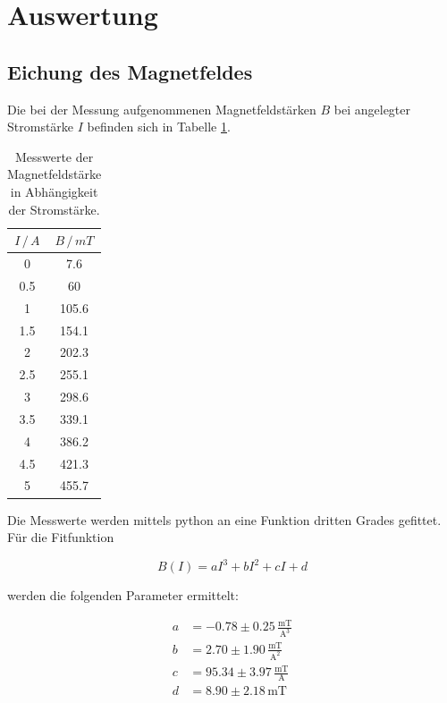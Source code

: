 \newpage
\section{Auswertung}
\label{sec:Auswertung}
\subsection{Eichung des Magnetfeldes}
\label{sec:eich}
Die bei der Messung aufgenommenen Magnetfeldstärken $B$ bei angelegter Stromstärke $I$ befinden sich in Tabelle \ref{tab:bfeld}.

\begin{table}
    \centering
    \begin{tabular}{c c}
    \toprule
    $I \,/\,A$ & $B \,/\, mT$ \\
     \midrule 
  0  & 7.6  \\
  0.5  & 60  \\
  1  & 105.6   \\
  1.5  & 154.1  \\
  2  & 202.3   \\
  2.5  & 255.1  \\
  3  & 298.6   \\
  3.5  & 339.1  \\
  4  &  386.2   \\
  4.5  &  421.3 \\
  5  & 455.7 \\
    \bottomrule
    \end{tabular}
    \caption{Messwerte der Magnetfeldstärke in Abhängigkeit der Stromstärke.}
    \label{tab:bfeld}
    \end{table}


\noindent
Die Messwerte werden mittels python an eine Funktion dritten Grades gefittet.
Für die Fitfunktion

\begin{equation*}
    B(I)=aI^3 + bI^2 + cI + d
\end{equation*}

\noindent
werden die folgenden Parameter ermittelt:

\begin{align*}
    a&=-0.78 \pm 0.25 \, \frac{\text{mT}}{\text{A}^3} \\
    b&=2.70  \pm 1.90 \, \frac{\text{mT}}{\text{A}^2} \\
    c&=95.34 \pm 3.97 \, \frac{\text{mT}}{\text{A}} \\
    d&=8.90  \pm 2.18 \, \text{mT} \\
\end{align*}

